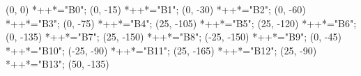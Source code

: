 \begin{scriptsize}
\xy(0, 0)
	*++{}*\frm{-,}="B0";
(0, -15)
	*++{}*\frm{-,}="B1";
(0, -30)
	*++{}*\frm{-,}="B2";
(0, -60)
	*++{}*\frm{-,}="B3";
(0, -75)
	*++{}*\frm{-,}="B4";
(25, -105)
	*++{}*\frm{-,}="B5";
(25, -120)
	*++{}*\frm{-,}="B6";
(0, -135)
	*++{}*\frm{-,}="B7";
(25, -150)
	*++{}*\frm{-,}="B8";
(-25, -150)
	*++{}*\frm{-,}="B9";
(0, -45)
	*++{}*\frm{-,}="B10";
(-25, -90)
	*++{}*\frm{-,}="B11";
(25, -165)
	*++{}*\frm{-,}="B12";
(25, -90)
	*++{}*\frm{-,}="B13";
(50, -135)

\end{scriptsize}
